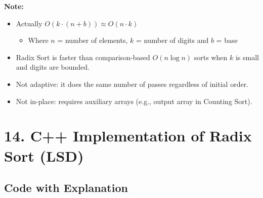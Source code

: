 \documentclass[14pt]{extarticle}
\begin{document}
\textbf{Note:}
\begin{itemize}[leftmargin=1.5em]
    \item Actually $O(k \cdot (n + b)) \approx O(n \cdot k)$
	\begin{itemize}[leftmargin=1.5em]
		\item Where $n$ = number of elements, $k$ = number of digits and $b$ = base 
	\end{itemize}
    \item Radix Sort is faster than comparison-based $O(n \log n)$ sorts when $k$ is small and digits are bounded.
    \item Not adaptive: it does the same number of passes regardless of initial order.
    \item Not in-place: requires auxiliary arrays (e.g., output array in Counting Sort).
\end{itemize}

\newpage
\section*{14. C++ Implementation of Radix Sort (LSD)}

\subsection*{Code with Explanation}
\end{document}
